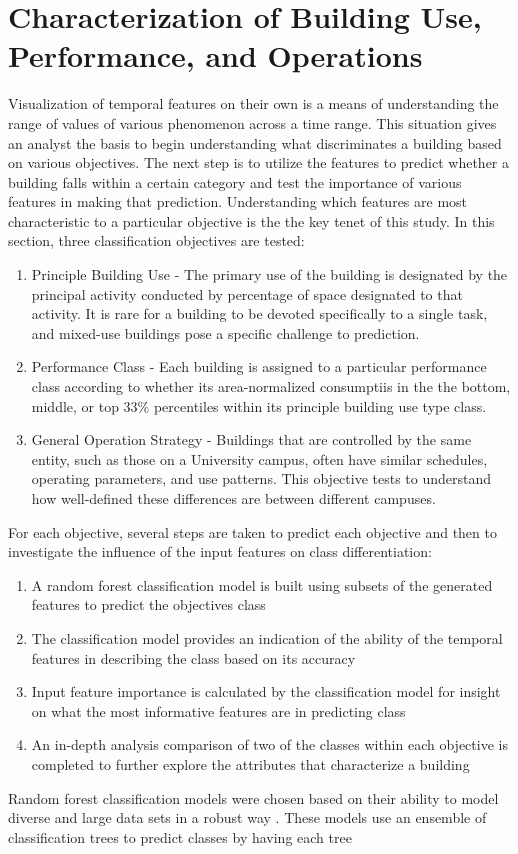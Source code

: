 \section{Characterization of Building Use, Performance, and Operations}
\label{sec:characterization}

Visualization of temporal features on their own is a means of understanding the range of values of various phenomenon across a time range. This situation gives an analyst the basis to begin understanding what discriminates a building based on various objectives. The next step is to utilize the features to predict whether a building falls within a certain category and test the importance of various features in making that prediction. Understanding which features are most characteristic to a particular objective is the the key tenet of this study. In this section, three classification objectives are tested: 

\begin{enumerate}
\item Principle Building Use - The primary use of the building is designated by the principal activity conducted by percentage of space designated to that activity. It is rare for a building to be devoted specifically to a single task, and mixed-use buildings pose a specific challenge to prediction.
\item Performance Class - Each building is assigned to a particular performance class according to whether its area-normalized consumptiis in the the bottom, middle, or top 33\% percentiles within its principle building use type class.
\item General Operation Strategy - Buildings that are controlled by the same entity, such as those on a University campus, often have similar schedules, operating parameters, and use patterns. This objective tests to understand how well-defined these differences are between different campuses.
\end{enumerate}

For each objective, several steps are taken to predict each objective and then to investigate the influence of the input features on class differentiation:
\begin{enumerate}
\item A random forest classification model is built using subsets of the generated features to predict the objectives class
\item The classification model provides an indication of the ability of the temporal features in describing the class based on its accuracy
\item Input feature importance is calculated by the classification model for insight on what the most informative features are in predicting class
\item An in-depth analysis comparison of two of the classes within each objective is completed to further explore the attributes that characterize a building
\end{enumerate}

Random forest classification models were chosen based on their ability to model diverse and large data sets in a robust way \cite{Breiman}. These models use an ensemble of classification trees to predict classes by having each tree 
